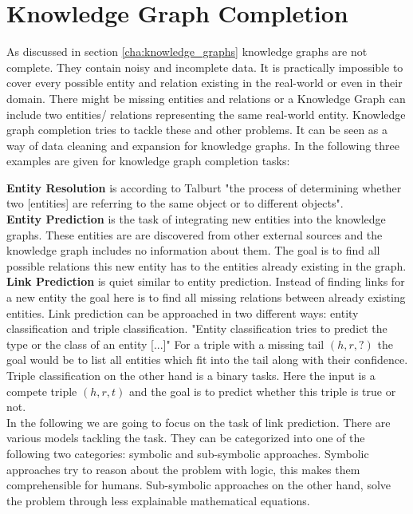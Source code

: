\chapter{Knowledge Graph Completion}
\label{cha:knowledge_graph_completion}

As discussed in section \ref{cha:knowledge_graphs} knowledge graphs are not complete. They contain noisy  and incomplete data. It is practically impossible to cover every possible entity and relation existing in the real-world or even in their domain. There might be missing entities and relations or a Knowledge Graph can include two entities/ relations representing the same real-world entity. Knowledge graph completion tries to tackle these and other problems. It can be seen as a way of data cleaning and expansion for knowledge graphs. In the following three examples are given for knowledge graph completion tasks:

\textbf{Entity Resolution} is according to Talburt "the process of determining whether two [entities] are referring to the same object or to different objects". \cite{talburt_entity_2011} \\ 

\textbf{Entity Prediction} is the task of integrating new entities into the knowledge graphs. These entities are are discovered from other external sources and the knowledge graph includes no information about them. The goal is to find all possible relations this new entity has to the entities already existing in the graph. \cite[p.~1]{baumgartner_entity_2021} \\

\textbf{Link Prediction} is quiet similar to entity prediction. Instead of finding links for a new entity the goal here is to find all missing relations between already existing entities. \cite[p.~125]{golbeck_analyzing_2013} Link prediction can be approached in two different ways: entity classification and triple classification. "Entity classification tries to predict the type or the class of an entity [...]" \cite{ilkou_symbolic_2020} For a triple with a missing tail $(h,r,?)$ the goal would be to list all entities which fit into the tail along with their confidence. Triple classification on the other hand is a binary tasks. Here the input is a compete triple $(h,r,t)$ and the goal is to predict whether this triple is true or not. \cite{ilkou_symbolic_2020} \\

In the following we are going to focus on the task of link prediction. There are various models tackling the task. They can be categorized into one of the following two categories: symbolic and sub-symbolic approaches. Symbolic approaches try to reason about the problem with logic, this makes them comprehensible for humans. Sub-symbolic approaches on the other hand, solve the problem through less explainable mathematical equations. \cite{ilkou_symbolic_2020}

